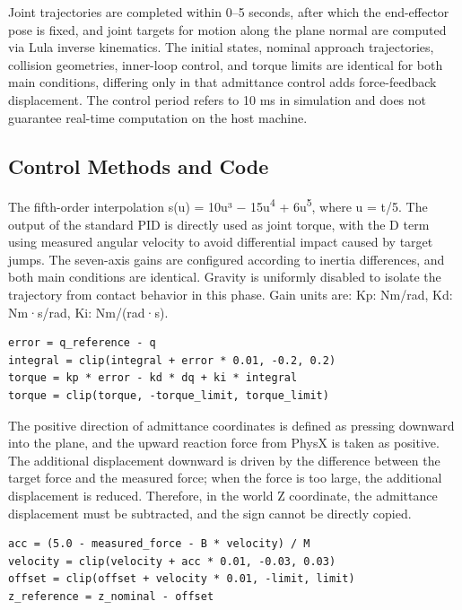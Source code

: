Joint trajectories are completed within 0–5 seconds, after which the end-effector pose is fixed, and joint targets for motion along the plane normal are computed via Lula inverse kinematics. The initial states, nominal approach trajectories, collision geometries, inner-loop control, and torque limits are identical for both main conditions, differing only in that admittance control adds force-feedback displacement. The control period refers to 10 ms in simulation and does not guarantee real-time computation on the host machine.


\subsection{Control Methods and Code}\label{s11-detail-2}

The fifth-order interpolation s(u) = 10u³ − 15u\textsuperscript{4} + 6u\textsuperscript{5}, where u = t/5. The output of the standard PID is directly used as joint torque, with the D term using measured angular velocity to avoid differential impact caused by target jumps. The seven-axis gains are configured according to inertia differences, and both main conditions are identical. Gravity is uniformly disabled to isolate the trajectory from contact behavior in this phase. Gain units are: Kp: Nm/rad, Kd: Nm·s/rad, Ki: Nm/(rad·s).

\begin{Verbatim}[breaklines=true,breakanywhere=true,fontsize=\footnotesize]
error = q_reference - q
integral = clip(integral + error * 0.01, -0.2, 0.2)
torque = kp * error - kd * dq + ki * integral
torque = clip(torque, -torque_limit, torque_limit)
\end{Verbatim}

The positive direction of admittance coordinates is defined as pressing downward into the plane, and the upward reaction force from PhysX is taken as positive. The additional displacement downward is driven by the difference between the target force and the measured force; when the force is too large, the additional displacement is reduced. Therefore, in the world Z coordinate, the admittance displacement must be subtracted, and the sign cannot be directly copied.

\begin{Verbatim}[breaklines=true,breakanywhere=true,fontsize=\footnotesize]
acc = (5.0 - measured_force - B * velocity) / M
velocity = clip(velocity + acc * 0.01, -0.03, 0.03)
offset = clip(offset + velocity * 0.01, -limit, limit)
z_reference = z_nominal - offset
\end{Verbatim}

